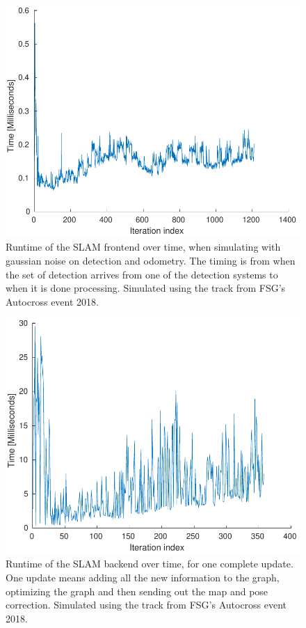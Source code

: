 \begin{figure}
    \centering
    \includegraphics[width=0.8\linewidth]{0_Images/6_Results/FrontendTiming.pdf}
    \caption[Runtime of the SLAM frontend.]
    {Runtime of the SLAM frontend over time, when simulating with gaussian noise on detection and odometry. The timing is from when the set of detection arrives from one of the detection systems to when it is done processing. Simulated using the track from FSG's Autocross event 2018.}
    \label{Fig:FrontendTiming}
\end{figure}

\begin{figure}
    \centering
    \includegraphics[width=0.8\linewidth]{0_Images/6_Results/BackendTiming.pdf}
    \caption[Runtime of the SLAM backend.]
    {Runtime of the SLAM backend over time, for one complete update. One update means adding all the new information to the graph, optimizing the graph and then sending out the map and pose correction. Simulated using the track from FSG's Autocross event 2018.}
    \label{Fig:BackendTiming}
\end{figure}


